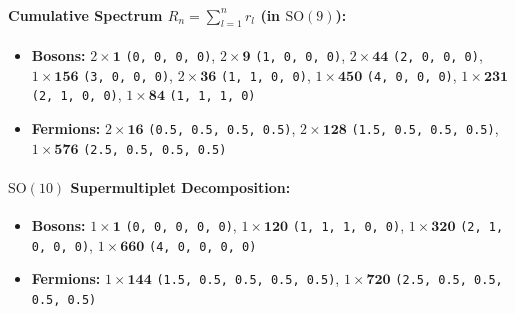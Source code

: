 \documentclass[11pt,a4paper]{article}
\begin{document}
\paragraph{Cumulative Spectrum $R_n = \sum_{l=1}^n r_l$ (in $\mathrm{SO}(9)$):}
\begin{itemize}
    \item \textbf{Bosons:} $2 \times \mathbf{1}$ \texttt{(0, 0, 0, 0)}, $2 \times \mathbf{9}$ \texttt{(1, 0, 0, 0)}, $2 \times \mathbf{44}$ \texttt{(2, 0, 0, 0)}, $1 \times \mathbf{156}$ \texttt{(3, 0, 0, 0)}, $2 \times \mathbf{36}$ \texttt{(1, 1, 0, 0)}, $1 \times \mathbf{450}$ \texttt{(4, 0, 0, 0)}, $1 \times \mathbf{231}$ \texttt{(2, 1, 0, 0)}, $1 \times \mathbf{84}$ \texttt{(1, 1, 1, 0)}
    \item \textbf{Fermions:} $2 \times \mathbf{16}$ \texttt{(0.5, 0.5, 0.5, 0.5)}, $2 \times \mathbf{128}$ \texttt{(1.5, 0.5, 0.5, 0.5)}, $1 \times \mathbf{576}$ \texttt{(2.5, 0.5, 0.5, 0.5)}
\end{itemize}
\paragraph{$\mathrm{SO}(10)$ Supermultiplet Decomposition:}
\begin{itemize}
    \item \textbf{Bosons:} $1 \times \mathbf{1}$ \texttt{(0, 0, 0, 0, 0)}, $1 \times \mathbf{120}$ \texttt{(1, 1, 1, 0, 0)}, $1 \times \mathbf{320}$ \texttt{(2, 1, 0, 0, 0)}, $1 \times \mathbf{660}$ \texttt{(4, 0, 0, 0, 0)}
    \item \textbf{Fermions:} $1 \times \mathbf{144}$ \texttt{(1.5, 0.5, 0.5, 0.5, 0.5)}, $1 \times \mathbf{720}$ \texttt{(2.5, 0.5, 0.5, 0.5, 0.5)}
\end{itemize}
\end{document}
